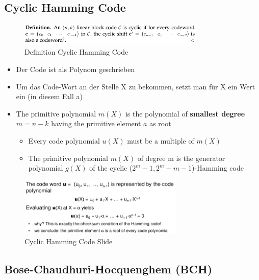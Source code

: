 \hypertarget{cyclic-hamming-code}{%
\subsection{Cyclic Hamming Code}\label{cyclic-hamming-code}}

\begin{figure}[H]
\centering
\includegraphics[width=0.8\textwidth]{figures/definitionCyclicHamming.png}
\caption{Definition Cyclic Hamming Code}
\end{figure}

\begin{itemize}
\tightlist
\item
  Der Code ist als Polynom geschrieben
\item
  Um das Code-Wort an der Stelle X zu bekommen, setzt man für X ein Wert
  ein (in diesem Fall a)
\item
  The primitive polynomial $m(X)$ is the polynomial of \textbf{smallest
  degree} $m = n - k$ having the primitive element $a$ as root

  \begin{itemize}
  \tightlist
  \item
    Every code polynomial $u(X)$ must be a multiple of $m(X)$
  \item
    The primitive polynomial $m(X)$ of degree m is the generator
    polynomial $g(X)$ of the cyclic ($2^m - 1, 2^m - m - 1$)-Hamming
    code
  \end{itemize}
\end{itemize}

\begin{figure}[H]
\centering
\includegraphics[width=0.7\textwidth]{figures/cyclicHammingCode.png}
\caption{Cyclic Hamming Code Slide}
\end{figure}

\hypertarget{bose-chaudhuri-hocquenghem-bch}{%
\subsection{Bose-Chaudhuri-Hocquenghem
(BCH)}\label{bose-chaudhuri-hocquenghem-bch}}


